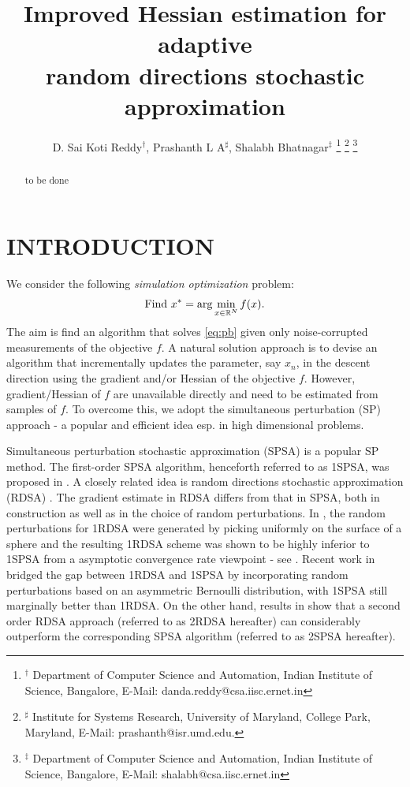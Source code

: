 \documentclass[letterpaper, 10 pt, conference]{ieeeconf}  %
\title{\LARGE \bf
Improved Hessian estimation for adaptive \\random directions stochastic approximation
}
\author{D. Sai Koti Reddy$^\dagger$, Prashanth L A$^\sharp$, Shalabh Bhatnagar$^\ddag$
\thanks{
$^\dagger$ Department of Computer Science and Automation,
Indian Institute of Science, Bangalore,
E-Mail: danda.reddy@csa.iisc.ernet.in}
\thanks{
$^\sharp$ Institute for Systems Research, University of Maryland, College Park, Maryland,
E-Mail: prashanth@isr.umd.edu.
}
\thanks{
$^\ddag$ Department of Computer Science and Automation,
Indian Institute of Science, Bangalore,
E-Mail: shalabh@csa.iisc.ernet.in
}
}
\begin{document}
\maketitle
\thispagestyle{empty}
\pagestyle{empty}


\begin{abstract}
to be done


\end{abstract}


\section{INTRODUCTION}
We consider the following \textit{simulation optimization} problem:
\begin{align}
\mbox{Find } x^* = \arg\min_{x \in \mathbb{R}^N} f(x). \label{eq:pb}
\end{align}
The aim is find an algorithm that solves \eqref{eq:pb} given only noise-corrupted measurements of the objective $f$.
A natural solution approach is to devise an algorithm that incrementally updates the parameter, say $x_n$, in the descent direction using the gradient and/or Hessian of the objective $f$. However, gradient/Hessian of $f$ are unavailable directly and need to be estimated from samples of $f$. 
To overcome this, we adopt the simultaneous perturbation (SP) approach - a popular and efficient idea esp. in high dimensional problems. 

Simultaneous perturbation stochastic approximation (SPSA) is a popular SP method. The first-order SPSA algorithm, henceforth referred to as 1SPSA, was proposed in \cite{spall}.  A closely related idea is random directions stochastic approximation (RDSA) \cite[pp.~58-60]{kushcla}. The gradient estimate in RDSA differs from that in SPSA, both in construction as well as in the choice of random perturbations.  In \cite{kushcla}, the random perturbations for 1RDSA were generated by picking uniformly on the surface of a sphere and the resulting 1RDSA scheme was shown to be highly inferior to 1SPSA from a asymptotic convergence rate viewpoint - see \cite{chin1997comparative}.  Recent work in \cite{prashanth2015rdsa} bridged the gap between 1RDSA and 1SPSA by incorporating random perturbations based on an asymmetric Bernoulli distribution, with 1SPSA still marginally better than 1RDSA. 
On the other hand, results in \cite{prashanth2015rdsa} show that a second order RDSA approach (referred to as 2RDSA hereafter) can considerably outperform the corresponding SPSA algorithm \cite{spall_adaptive} (referred to as 2SPSA hereafter).  
\end{document}
